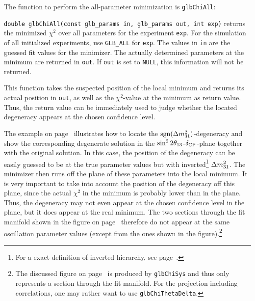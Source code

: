 The function to perform the all-parameter minimization is {\tt glbChiAll}:
\begin{function}
{\tt double glbChiAll(const glb\_params in, glb\_params out, int exp)}
  returns the minimized $\chi^2$ over all parameters for the  experiment {\tt exp}. For the simulation of all initialized experiments,
use {\tt GLB\_ALL} for {\tt exp}. The values in {\tt in} are the guessed fit values for the minimizer. The actually determined parameters at the minimum are returned in {\tt out}. If {\tt out} is set to {\tt NULL}, this information will not be returned.
\end{function}
%
This function takes the suspected position of the local minimum and returns its actual position in {\tt out}, as well as the $\chi^2$-value 
at the minimum as return value. Thus, the return value can be immediately
used to judge whether the located degeneracy appears at the chosen
confidence level.

The example on page~\pageref{ex:sgndeg} illustrates how to locate the $\mathrm{sgn}(\Delta m_{31}^2)$-degeneracy and show the corresponding degenerate solution in the $\sin^2 2 \theta_{13}$-$\delta_{\mathrm{CP}}$-plane together with the original solution.
In this case, the position of the degeneracy can be easily guessed to be 
at the true parameter values but with inverted\footnote{For a exact 
definition of 
inverted hierarchy, see page~\pageref{mass_ordering}.} $\Delta m_{31}^2$. The minimizer then runs off the plane of these parameters into the local minimum. It is very important to take into account the position of the degeneracy off this plane, since the actual $\chi^2$ in the minimum is probably lower than in the plane. Thus, the degeneracy may not even appear at the chosen confidence level in the plane, but it does appear at the real minimum. The two sections through the fit manifold shown in the figure on page~\pageref{ex:sgndeg} therefore do not appear at the same oscillation parameter values (except from the ones shown in the 
figure).\footnote{The discussed figure on page~\pageref{ex:sgndeg} is produced by  {\tt glbChiSys} and thus only represents a section through the fit manifold. For the projection including correlations, one may rather want to use {\tt glbChiThetaDelta}.} 

